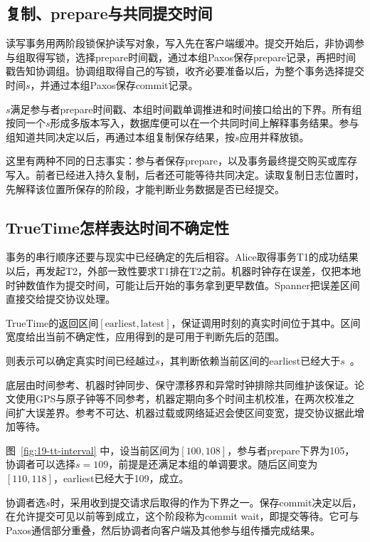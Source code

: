 \subsection{复制、prepare与共同提交时间}

读写事务用两阶段锁保护读写对象，写入先在客户端缓冲。提交开始后，非协调参与组取得写锁，选择prepare时间戳，通过本组Paxos保存prepare记录，再把时间戳告知协调组。协调组取得自己的写锁，收齐必要准备以后，为整个事务选择提交时间$s$，并通过本组Paxos保存commit记录。

$s$满足参与者prepare时间戳、本组时间戳单调推进和时间接口给出的下界。所有组按同一个$s$形成多版本写入，数据库便可以在一个共同时间上解释事务结果。参与组知道共同决定以后，再通过本组复制保存结果，按$s$应用并释放锁。

这里有两种不同的日志事实：参与者保存prepare，以及事务最终提交购买或库存写入。前者已经进入持久复制，后者还可能等待共同决定。读取复制日志位置时，先解释该位置所保存的阶段，才能判断业务数据是否已经提交。

\subsection{TrueTime怎样表达时间不确定性}

事务的串行顺序还要与现实中已经确定的先后相容。Alice取得事务T1的成功结果以后，再发起T2，外部一致性要求T1排在T2之前。机器时钟存在误差，仅把本地时钟数值作为提交时间，可能让后开始的事务拿到更早数值。Spanner把误差区间直接交给提交协议处理。

TrueTime的返回区间$[\mathrm{earliest},\mathrm{latest}]$，保证调用时刻的真实时间位于其中。区间宽度给出当前不确定性，应用得到的是可用于判断先后的范围。

则表示可以确定真实时间已经越过$s$，其判断依赖当前区间的earliest已经大于$s$~\cite{spanner2012}。

底层由时间参考、机器时钟同步、保守漂移界和异常时钟排除共同维护该保证。论文使用GPS与原子钟等不同参考，机器定期向多个时间主机校准，在两次校准之间扩大误差界。参考不可达、机器过载或网络延迟会使区间变宽，提交协议据此增加等待。


图~\ref{fig:19-tt-interval} 中，设当前区间为$[100,108]$，参与者prepare下界为105，协调者可以选择$s=109$，前提是还满足本组的单调要求。随后区间变为$[110,118]$，earliest已经大于109，成立。

协调者选$s$时，采用收到提交请求后取得的作为下界之一。保存commit决定以后，在允许提交可见以前等到成立，这个阶段称为commit wait，即提交等待。它可与Paxos通信部分重叠，然后协调者向客户端及其他参与组传播完成结果。

